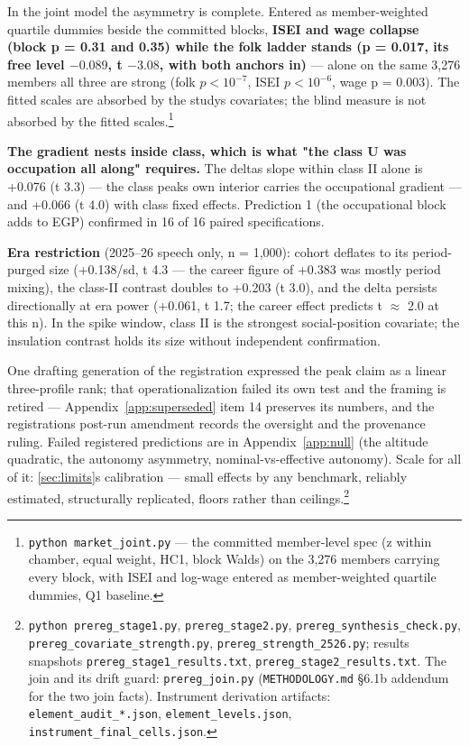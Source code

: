 In the joint model the asymmetry is complete. Entered as
member-weighted quartile dummies beside the committed blocks, \textbf{ISEI and
wage collapse (block p = 0.31 and 0.35) while the folk ladder stands
(p = 0.017, its free level \(-0.089\), t \(-3.08\), with both anchors in)} ---
alone on the same 3,276 members all three are strong (folk \(p < 10^{-7}\), ISEI
\(p < 10^{-6}\), wage p = 0.003). The fitted scales are absorbed by the study\textquotesingle s
covariates; the blind measure is not absorbed by the fitted
scales.\footnote{\texttt{python\ market\_joint.py} --- the committed member-level spec
  (z within chamber, equal weight, HC1, block Walds) on the 3,276
  members carrying every block, with ISEI and log-wage entered as
  member-weighted quartile dummies, Q1 baseline.}

\textbf{The gradient nests inside class, which is what "the class U was
occupation all along" requires.} The delta\textquotesingle s slope within class II alone is
+0.076 (t 3.3) --- the class peak\textquotesingle s own interior carries the occupational
gradient --- and +0.066 (t 4.0) with class fixed effects. Prediction 1 (the
occupational block adds to EGP) confirmed in 16 of 16 paired
specifications.

\textbf{Era restriction} (2025--26 speech only, n = 1,000): cohort deflates to
its period-purged size (+0.138/sd, t 4.3 --- the career figure of +0.383 was
mostly period mixing), the class-II contrast doubles to +0.203 (t 3.0), and
the delta persists directionally at era power (+0.061, t 1.7; the career
effect predicts t \(\approx\) 2.0 at this n). In the spike window, class II is the
strongest social-position covariate; the insulation contrast holds its size
without independent confirmation.

One drafting generation of the registration expressed the peak claim as a
linear three-profile rank; that operationalization failed its own test and
the framing is retired --- Appendix~\ref{app:superseded} item 14 preserves its numbers, and the
registration\textquotesingle s post-run amendment records the oversight and the provenance
ruling. Failed registered predictions are in Appendix~\ref{app:null} (the altitude
quadratic, the autonomy asymmetry, nominal-vs-effective autonomy). Scale
for all of it: \cref{sec:limits}\textquotesingle s calibration --- small effects by any benchmark,
reliably estimated, structurally replicated, floors rather than
ceilings.\footnote{\texttt{python\ prereg\_\allowbreak{}stage1.\allowbreak{}py}, \texttt{prereg\_stage2.py},
  \texttt{prereg\_\allowbreak{}synthesis\_\allowbreak{}check.\allowbreak{}py}, \texttt{prereg\_\allowbreak{}covariate\_\allowbreak{}strength.\allowbreak{}py},
  \texttt{prereg\_\allowbreak{}strength\_\allowbreak{}2526.\allowbreak{}py}; results snapshots
  \texttt{prereg\_\allowbreak{}stage1\_\allowbreak{}results.\allowbreak{}txt}, \texttt{prereg\_\allowbreak{}stage2\_\allowbreak{}results.\allowbreak{}txt}. The join and
  its drift guard: \texttt{prereg\_join.py} (\texttt{METHODOLOGY.md} §6.1b addendum for the
  two join facts). Instrument derivation artifacts:
  \texttt{element\_audit\_*.json}, \texttt{element\_levels.json},
  \texttt{instrument\_\allowbreak{}final\_\allowbreak{}cells.\allowbreak{}json}.}

